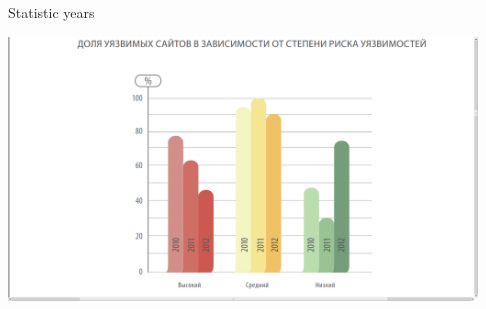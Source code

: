 \begin{frame}[fragile]{Statistic years}
  \begin{center}
    \includegraphics[height=7cm, keepaspectratio]{sources/images/securtiy_statistic_dinamic.png}
  \end{center}
\end{frame}
